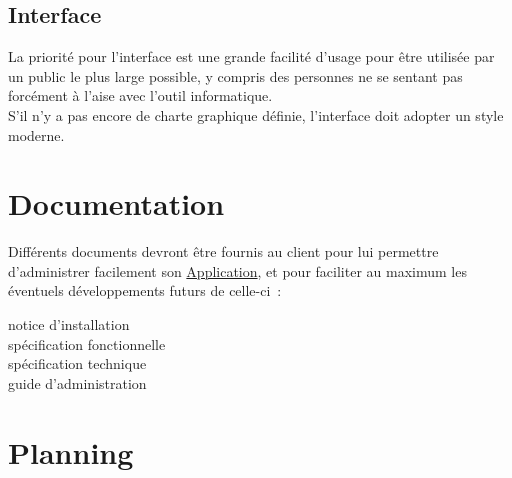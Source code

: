 \documentclass[french,12pt]{article}
\begin{document}
		\subsection{Interface}

			La priorité pour l’interface est une grande facilité d’usage pour être
			 utilisée par un public le plus large possible, y compris des personnes ne
			 se sentant pas forcément à l’aise avec l’outil informatique.\\
			S’il n’y a pas encore de charte graphique définie, l’interface doit
			 adopter un style moderne.

	\section{Documentation}

		Différents documents devront être fournis au client pour lui permettre
		 d’administrer facilement son \hyperlink{application}{Application}, et pour
		 faciliter au maximum les éventuels développements futurs de celle-ci :
		\begin{description}
			\item [notice d’installation]
			\item [spécification fonctionnelle]
			\item [spécification technique]
			\item [guide d’administration]
		\end{description}

	\newpage
	\section{Planning}
\end{document}
